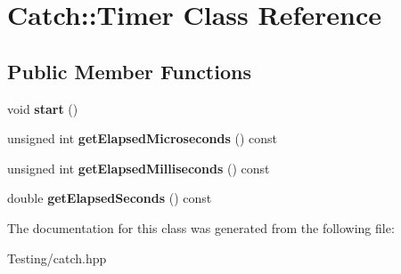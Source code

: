 \hypertarget{class_catch_1_1_timer}{\section{Catch\-:\-:Timer Class Reference}
\label{class_catch_1_1_timer}
}
\subsection*{Public Member Functions}
\begin{DoxyCompactItemize}
\item 
\hypertarget{class_catch_1_1_timer_a0a56e879e43f36c102bf9ea8b5fc8b72}{void {\bfseries start} ()}\label{class_catch_1_1_timer_a0a56e879e43f36c102bf9ea8b5fc8b72}

\item 
\hypertarget{class_catch_1_1_timer_a4b0062f169f7d3150b0e8073ab37890a}{unsigned int {\bfseries get\-Elapsed\-Microseconds} () const }\label{class_catch_1_1_timer_a4b0062f169f7d3150b0e8073ab37890a}

\item 
\hypertarget{class_catch_1_1_timer_a4cf3f9fbee9c76e87d989d9bc6913b68}{unsigned int {\bfseries get\-Elapsed\-Milliseconds} () const }\label{class_catch_1_1_timer_a4cf3f9fbee9c76e87d989d9bc6913b68}

\item 
\hypertarget{class_catch_1_1_timer_a8500ef3481a9bf6ae81337972d9f95a3}{double {\bfseries get\-Elapsed\-Seconds} () const }\label{class_catch_1_1_timer_a8500ef3481a9bf6ae81337972d9f95a3}

\end{DoxyCompactItemize}


The documentation for this class was generated from the following file\-:\begin{DoxyCompactItemize}
\item 
Testing/catch.\-hpp\end{DoxyCompactItemize}
